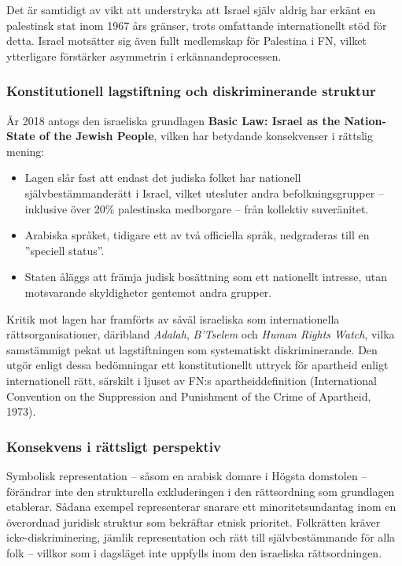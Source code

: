 Det är samtidigt av vikt att understryka att Israel själv aldrig har erkänt en palestinsk stat inom 1967 års gränser, trots omfattande internationellt stöd för detta. Israel motsätter sig även fullt medlemskap för Palestina i FN, vilket ytterligare förstärker asymmetrin i erkännandeprocessen.

\subsubsection*{Konstitutionell lagstiftning och diskriminerande struktur}

År 2018 antogs den israeliska grundlagen \textbf{Basic Law: Israel as the Nation-State of the Jewish People}, vilken har betydande konsekvenser i rättslig mening:

\begin{itemize}
  \item Lagen slår fast att endast det judiska folket har nationell självbestämmanderätt i Israel, vilket utesluter andra befolkningsgrupper – inklusive över 20\% palestinska medborgare – från kollektiv suveränitet.
  \item Arabiska språket, tidigare ett av två officiella språk, nedgraderas till en ”speciell status”.
  \item Staten åläggs att främja judisk bosättning som ett nationellt intresse, utan motsvarande skyldigheter gentemot andra grupper.
\end{itemize}

Kritik mot lagen har framförts av såväl israeliska som internationella rättsorganisationer, däribland \textit{Adalah}, \textit{B’Tselem} och \textit{Human Rights Watch}, vilka samstämmigt pekat ut lagstiftningen som systematiskt diskriminerande. Den utgör enligt dessa bedömningar ett konstitutionellt uttryck för apartheid enligt internationell rätt, särskilt i ljuset av FN:s apartheiddefinition (International Convention on the Suppression and Punishment of the Crime of Apartheid, 1973).

\subsubsection*{Konsekvens i rättsligt perspektiv}

Symbolisk representation – såsom en arabisk domare i Högsta domstolen – förändrar inte den strukturella exkluderingen i den rättsordning som grundlagen etablerar. Sådana exempel representerar snarare ett minoritetsundantag inom en överordnad juridisk struktur som bekräftar etnisk prioritet. Folkrätten kräver icke-diskriminering, jämlik representation och rätt till självbestämmande för alla folk – villkor som i dagsläget inte uppfylls inom den israeliska rättsordningen.

